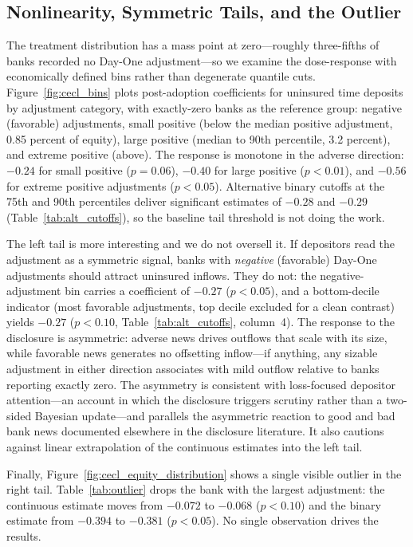 \subsection{Nonlinearity, Symmetric Tails, and the Outlier}
\label{sec:robustness:nonlinearity}

The treatment distribution has a mass point at zero---roughly three-fifths
of banks recorded no Day-One adjustment---so we examine the dose-response
with economically defined bins rather than degenerate quantile cuts.
Figure~\ref{fig:cecl_bins} plots post-adoption coefficients for uninsured
time deposits by adjustment category, with exactly-zero banks as the
reference group: negative (favorable) adjustments, small positive (below the
median positive adjustment, 0.85 percent of equity), large positive (median
to 90th percentile, 3.2 percent), and extreme positive (above).  The
response is monotone in the adverse direction: $-0.24$ for small positive
($p = 0.06$), $-0.40$ for large positive ($p < 0.01$), and $-0.56$ for
extreme positive adjustments ($p < 0.05$).  Alternative binary cutoffs at
the 75th and 90th percentiles deliver significant estimates of $-0.28$ and
$-0.29$ (Table~\ref{tab:alt_cutoffs}), so the baseline tail threshold is not
doing the work.

The left tail is more interesting and we do not oversell it.  If depositors
read the adjustment as a symmetric signal, banks with \emph{negative}
(favorable) Day-One adjustments should attract uninsured inflows.  They do
not: the negative-adjustment bin carries a coefficient of $-0.27$
($p < 0.05$), and a bottom-decile indicator (most favorable adjustments,
top decile excluded for a clean contrast) yields $-0.27$ ($p < 0.10$,
Table~\ref{tab:alt_cutoffs}, column~4).  The response to the disclosure is
asymmetric: adverse news drives outflows that scale with its size, while
favorable news generates no offsetting inflow---if anything, any sizable
adjustment in either direction associates with mild outflow relative to
banks reporting exactly zero.  The asymmetry is consistent with
loss-focused depositor attention---an account in which the disclosure
triggers scrutiny rather than a two-sided Bayesian update---and parallels
the asymmetric reaction to good and bad bank news documented elsewhere in
the disclosure literature.  It also cautions against linear extrapolation
of the continuous estimates into the left tail.

Finally, Figure~\ref{fig:cecl_equity_distribution} shows a single visible
outlier in the right tail.  Table~\ref{tab:outlier} drops the bank with the
largest adjustment: the continuous estimate moves from $-0.072$ to $-0.068$
($p < 0.10$) and the binary estimate from $-0.394$ to $-0.381$
($p < 0.05$).  No single observation drives the results.

